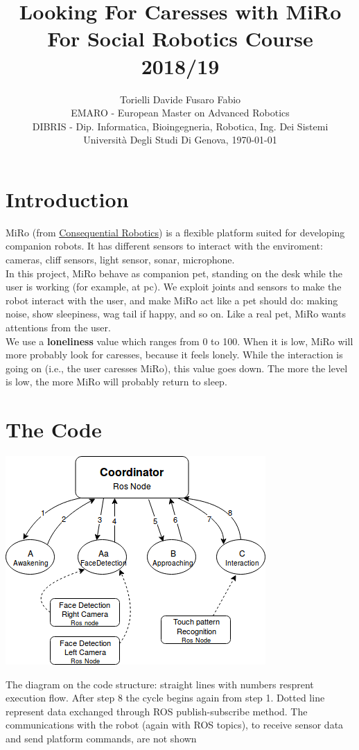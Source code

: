 \documentclass[12pt,peerreviewca, a4paper, onecolumn]{article}
\title{\LARGE\textbf{Looking For Caresses with MiRo}\\\large For Social Robotics Course 2018/19}
\author{\large{Torielli Davide \quad Fusaro Fabio} \\
	\small EMARO - European Master on Advanced Robotics\\
	\small DIBRIS - Dip. Informatica, Bioingegneria, Robotica, Ing. Dei Sistemi\\
	\small Universit\`{a} Degli Studi Di Genova, \today}
\begin{document}
	\maketitle
	
	\section{Introduction}
	MiRo (from \href{http://consequentialrobotics.com/}{Consequential Robotics}) is a flexible platform suited for developing companion robots. It has different sensors to interact with the enviroment: cameras, cliff sensors, light sensor, sonar, microphone.\\
	In this project, MiRo behave as companion pet, standing on the desk while the user is working (for example, at pc). We exploit joints and sensors to make the robot interact with the user, and make MiRo act like a pet should do: making noise, show sleepiness, wag tail if happy, and so on. Like a real pet, MiRo wants attentions from the user.\\ 
	We use a \textbf{loneliness} value which ranges from 0 to 100. When it is low, MiRo will more probably look for caresses, because it feels lonely. While the interaction is going on (i.e., the user caresses  MiRo), this value goes down. The more the level is low, the more MiRo will probably return to sleep.
	
	\section{The Code}
	\begin{center}
		\includegraphics[scale=0.5]{diagram}
	\end{center}
	{\small The diagram on the code structure: straight lines with numbers resprent execution flow. After step 8 the cycle begins again from step 1. Dotted line represent data exchanged through ROS publish-subscribe method. The communications with the robot (again with ROS topics), to receive sensor data and send platform commands, are not shown}\\
\end{document}
